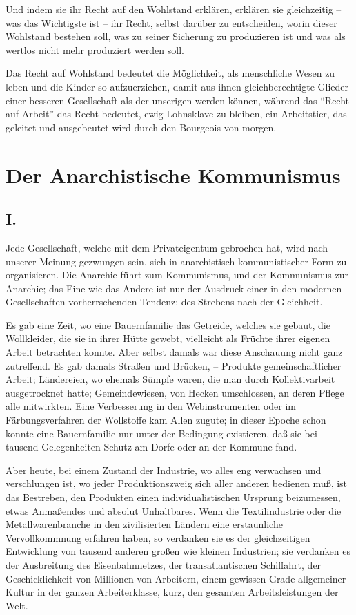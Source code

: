 \documentclass{scrbook}
\begin{document}
Und indem sie ihr Recht auf den Wohlstand erklären, erklären sie gleichzeitig – was das Wichtigste ist – ihr Recht, selbst darüber zu entscheiden, worin dieser Wohlstand bestehen soll, was zu seiner Sicherung zu produzieren ist und was als wertlos nicht mehr produziert werden soll.

Das Recht auf Wohlstand bedeutet die Möglichkeit, als menschliche Wesen zu leben und die Kinder so aufzuerziehen, damit aus ihnen gleichberechtigte Glieder einer besseren Gesellschaft als der unserigen werden können, während das ``Recht auf Arbeit'' das Recht bedeutet, ewig Lohnsklave zu bleiben, ein Arbeitstier, das geleitet und ausgebeutet wird durch den Bourgeois von morgen. 

\chapter{Der Anarchistische Kommunismus}
\section*{I.}

Jede Gesellschaft, welche mit dem Privateigentum gebrochen hat, wird nach unserer Meinung gezwungen sein, sich in anarchistisch-kommunistischer Form zu organisieren. Die Anarchie führt zum Kommunismus, und der Kommunismus zur Anarchie; das Eine wie das Andere ist nur der Ausdruck einer in den modernen Gesellschaften vorherrschenden Tendenz: des Strebens nach der Gleichheit.

Es gab eine Zeit, wo eine Bauernfamilie das Getreide, welches sie gebaut, die Wollkleider, die sie in ihrer Hütte gewebt, vielleicht als Früchte ihrer eigenen Arbeit betrachten konnte. Aber selbst damals war diese Anschauung nicht ganz zutreffend. Es gab damals Straßen und Brücken, – Produkte gemeinschaftlicher Arbeit; Ländereien, wo ehemals Sümpfe waren, die man durch Kollektivarbeit ausgetrocknet hatte; Gemeindewiesen, von Hecken umschlossen, an deren Pflege alle mitwirkten. Eine Verbesserung in den Webinstrumenten oder im Färbungsverfahren der Wollstoffe kam Allen zugute; in dieser Epoche schon konnte eine Bauernfamilie nur unter der Bedingung existieren, daß sie bei tausend Gelegenheiten Schutz am Dorfe oder an der Kommune fand.

Aber heute, bei einem Zustand der Industrie, wo alles eng verwachsen und verschlungen ist, wo jeder Produktionszweig sich aller anderen bedienen muß, ist das Bestreben, den Produkten einen individualistischen Ursprung beizumessen, etwas Anmaßendes und absolut Unhaltbares. Wenn die Textilindustrie oder die Metallwarenbranche in den zivilisierten Ländern eine erstaunliche Vervollkommnung erfahren haben, so verdanken sie es der gleichzeitigen Entwicklung von tausend anderen großen wie kleinen Industrien; sie verdanken es der Ausbreitung des Eisenbahnnetzes, der transatlantischen Schiffahrt, der Geschicklichkeit von Millionen von Arbeitern, einem gewissen Grade allgemeiner Kultur in der ganzen Arbeiterklasse, kurz, den gesamten Arbeitsleistungen der Welt.
\end{document}
